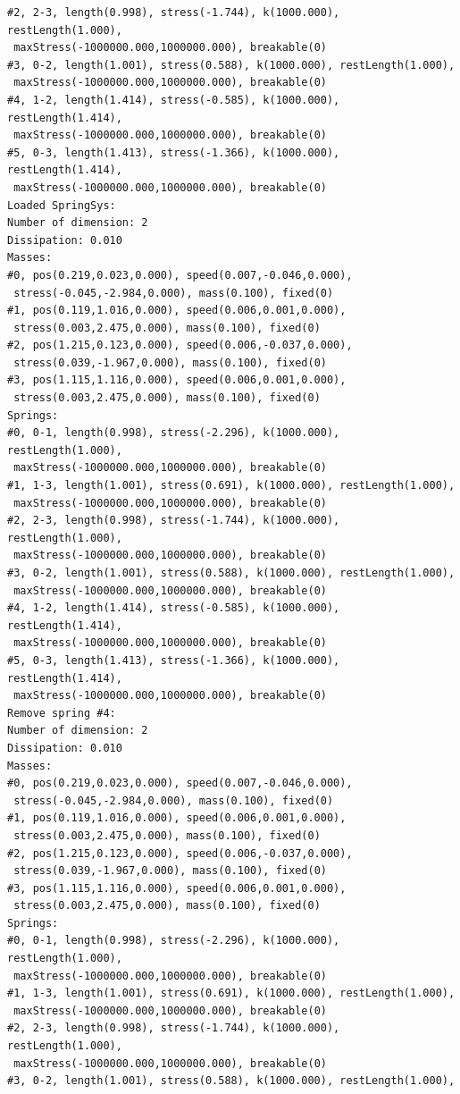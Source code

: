 \documentclass[12pt, a4paper]{article}
\begin{document}
\begin{scriptsize}
\begin{ttfamily}
\begin{lstlisting}
#2, 2-3, length(0.998), stress(-1.744), k(1000.000), restLength(1.000),
 maxStress(-1000000.000,1000000.000), breakable(0)
#3, 0-2, length(1.001), stress(0.588), k(1000.000), restLength(1.000),
 maxStress(-1000000.000,1000000.000), breakable(0)
#4, 1-2, length(1.414), stress(-0.585), k(1000.000), restLength(1.414),
 maxStress(-1000000.000,1000000.000), breakable(0)
#5, 0-3, length(1.413), stress(-1.366), k(1000.000), restLength(1.414),
 maxStress(-1000000.000,1000000.000), breakable(0)
Loaded SpringSys:
Number of dimension: 2
Dissipation: 0.010
Masses:
#0, pos(0.219,0.023,0.000), speed(0.007,-0.046,0.000),
 stress(-0.045,-2.984,0.000), mass(0.100), fixed(0)
#1, pos(0.119,1.016,0.000), speed(0.006,0.001,0.000),
 stress(0.003,2.475,0.000), mass(0.100), fixed(0)
#2, pos(1.215,0.123,0.000), speed(0.006,-0.037,0.000),
 stress(0.039,-1.967,0.000), mass(0.100), fixed(0)
#3, pos(1.115,1.116,0.000), speed(0.006,0.001,0.000),
 stress(0.003,2.475,0.000), mass(0.100), fixed(0)
Springs:
#0, 0-1, length(0.998), stress(-2.296), k(1000.000), restLength(1.000),
 maxStress(-1000000.000,1000000.000), breakable(0)
#1, 1-3, length(1.001), stress(0.691), k(1000.000), restLength(1.000),
 maxStress(-1000000.000,1000000.000), breakable(0)
#2, 2-3, length(0.998), stress(-1.744), k(1000.000), restLength(1.000),
 maxStress(-1000000.000,1000000.000), breakable(0)
#3, 0-2, length(1.001), stress(0.588), k(1000.000), restLength(1.000),
 maxStress(-1000000.000,1000000.000), breakable(0)
#4, 1-2, length(1.414), stress(-0.585), k(1000.000), restLength(1.414),
 maxStress(-1000000.000,1000000.000), breakable(0)
#5, 0-3, length(1.413), stress(-1.366), k(1000.000), restLength(1.414),
 maxStress(-1000000.000,1000000.000), breakable(0)
Remove spring #4:
Number of dimension: 2
Dissipation: 0.010
Masses:
#0, pos(0.219,0.023,0.000), speed(0.007,-0.046,0.000),
 stress(-0.045,-2.984,0.000), mass(0.100), fixed(0)
#1, pos(0.119,1.016,0.000), speed(0.006,0.001,0.000),
 stress(0.003,2.475,0.000), mass(0.100), fixed(0)
#2, pos(1.215,0.123,0.000), speed(0.006,-0.037,0.000),
 stress(0.039,-1.967,0.000), mass(0.100), fixed(0)
#3, pos(1.115,1.116,0.000), speed(0.006,0.001,0.000),
 stress(0.003,2.475,0.000), mass(0.100), fixed(0)
Springs:
#0, 0-1, length(0.998), stress(-2.296), k(1000.000), restLength(1.000),
 maxStress(-1000000.000,1000000.000), breakable(0)
#1, 1-3, length(1.001), stress(0.691), k(1000.000), restLength(1.000),
 maxStress(-1000000.000,1000000.000), breakable(0)
#2, 2-3, length(0.998), stress(-1.744), k(1000.000), restLength(1.000),
 maxStress(-1000000.000,1000000.000), breakable(0)
#3, 0-2, length(1.001), stress(0.588), k(1000.000), restLength(1.000),

\end{lstlisting}
\end{ttfamily}
\end{scriptsize}
\end{document}

